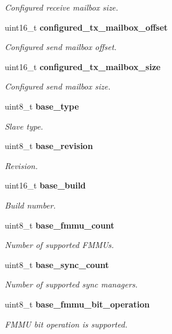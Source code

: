 \begin{DoxyCompactItemize}
\begin{DoxyCompactList}\small\item\em \-Configured receive mailbox size. \end{DoxyCompactList}\item 
uint16\-\_\-t {\bf configured\-\_\-tx\-\_\-mailbox\-\_\-offset}
\begin{DoxyCompactList}\small\item\em \-Configured send mailbox offset. \end{DoxyCompactList}\item 
uint16\-\_\-t {\bf configured\-\_\-tx\-\_\-mailbox\-\_\-size}
\begin{DoxyCompactList}\small\item\em \-Configured send mailbox size. \end{DoxyCompactList}\item 
uint8\-\_\-t {\bf base\-\_\-type}
\begin{DoxyCompactList}\small\item\em \-Slave type. \end{DoxyCompactList}\item 
uint8\-\_\-t {\bf base\-\_\-revision}
\begin{DoxyCompactList}\small\item\em \-Revision. \end{DoxyCompactList}\item 
uint16\-\_\-t {\bf base\-\_\-build}
\begin{DoxyCompactList}\small\item\em \-Build number. \end{DoxyCompactList}\item 
uint8\-\_\-t {\bf base\-\_\-fmmu\-\_\-count}
\begin{DoxyCompactList}\small\item\em \-Number of supported \-F\-M\-M\-Us. \end{DoxyCompactList}\item 
uint8\-\_\-t {\bf base\-\_\-sync\-\_\-count}
\begin{DoxyCompactList}\small\item\em \-Number of supported sync managers. \end{DoxyCompactList}\item 
uint8\-\_\-t {\bf base\-\_\-fmmu\-\_\-bit\-\_\-operation}
\begin{DoxyCompactList}\small\item\em \-F\-M\-M\-U bit operation is supported. \end{DoxyCompactList}\item 

\end{DoxyCompactItemize}
